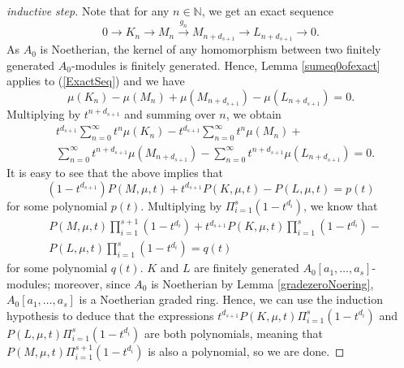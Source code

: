 \begin{proof}[inductive step]
Note that for any $n\in\mathbb{N}$, we get an exact sequence
\begin{equation}
\label{ExactSeq}
0\rightarrow{K_n}\rightarrow{M_n}\stackrel{g_n}{\rightarrow}{M_{n+d_{s+1}}}\rightarrow{L_{n+d_{s+1}}}\rightarrow{0}.
\end{equation}
As $A_0$ is Noetherian, the kernel of any homomorphism between two finitely generated $A_0$-modules is finitely generated. Hence, Lemma \ref{sumeq0ofexact} applies to (\ref{ExactSeq}) and we have
\begin{equation}
\mu(K_n)-\mu(M_n)+\mu(M_{n+d_{s+1}})-\mu(L_{n+d_{s+1}})=0.
\end{equation}
Multiplying by $t^{n+d_{s+1}}$ and summing over $n$, we obtain
\begin{equation}
\begin{split}
& t^{d_{s+1}}\sum_{n=0}^{\infty}t^{n}\mu(K_n)-t^{d_{s+1}}\sum_{n=0}^{\infty}t^{n}\mu(M_n)+
\\
& \sum_{n=0}^{\infty}t^{n+d_{s+1}}\mu(M_{n+d_{s+1}})-\sum_{n=0}^{\infty}t^{n+d_{s+1}}\mu(L_{n+d_{s+1}})=0.
\end{split}
\end{equation}
It is easy to see that the above implies that
\begin{equation}
(1-t^{d_{s+1}})P(M,\mu,t)+t^{d_{s+1}}P(K,\mu,t)-P(L,\mu,t)=p(t)
\end{equation}
for some polynomial $p(t)$. Multiplying by $\Pi_{i=1}^{s}(1-t^{d_i})$, we know that
\begin{equation}
\begin{split}
& P(M,\mu,t)\prod_{i=1}^{s+1}(1-t^{d_i})+t^{d_{s+1}}P(K,\mu,t)\prod_{i=1}^{s}(1-t^{d_i})
-
\\
& P(L,\mu,t)\prod_{i=1}^{s}(1-t^{d_i})=q(t)
\end{split}
\end{equation}
for some polynomial $q(t)$. $K$ and $L$ are finitely generated $A_0[a_1,\ldots,a_{s}]$-modules; moreover, since $A_0$ is Noetherian by Lemma \ref{gradezeroNoering}, $A_0[a_1,\ldots,a_{s}]$ is a Noetherian graded ring. Hence, we can use the induction hypothesis to deduce that the expressions $t^{d_{s+1}}P(K,\mu,t)\Pi_{i=1}^{s}(1-t^{d_i})$ and $P(L,\mu,t)\Pi_{i=1}^{s}(1-t^{d_i})$ are both polynomials, meaning that $P(M,\mu,t)\Pi_{i=1}^{s+1}(1-t^{d_i})$ is also a polynomial, so we are done.
\end{proof}
